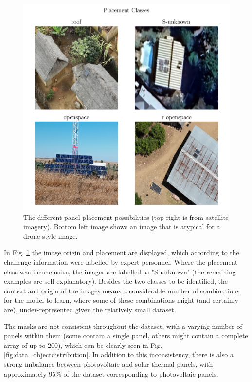 \documentclass[conference]{IEEEtran}
\begin{document}
\begin{figure}[H]
    \centering
    \includegraphics[width=1\linewidth]{assets/data_placement_classes.png}
    \caption{The different panel placement possibilities (top right is from satellite imagery). Bottom left image shows an image that is atypical for a drone style image.}
    \label{fig:data_placement_classes}
\end{figure}

In Fig. \ref{fig:data_placement_classes} the image origin and placement are displayed, which according to the challenge information were labelled by expert personnel. Where the placement class was inconclusive, the images are labelled as "S-unknown" (the remaining examples are self-explanatory). Besides the two classes to be identified, the context and origin of the images means a considerable number of combinations for the model to learn, where some of these combinations might (and certainly are), under-represented given the relatively small dataset.

The masks are not consistent throughout the dataset, with a varying number of panels within them (some contain a single panel, others might contain a complete array of up to 200), which can be clearly seen in Fig. \ref{fig:data_objectdistribution}. In addition to this inconsistency, there is also a strong imbalance between photovoltaic and solar thermal panels, with approximately 95\% of the dataset corresponding to photovoltaic panels.
\end{document}
